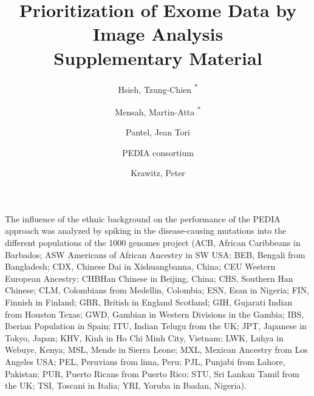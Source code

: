 \documentclass[11pt]{article}
\newcommand{\beginsupplement}{%
        \setcounter{table}{1}
        \setcounter{figure}{0}
        \renewcommand{\thefigure}{Supplementary \arabic{figure}}%
     }
\begin{document}
\title{\textbf{Prioritization of Exome Data by Image Analysis \\ Supplementary Material}}
\author[1, 2]{Hsieh, Tzung-Chien \textsuperscript{*}}
\author[2, 3]{Mensah, Martin-Atta \textsuperscript{*}}
\author[2, 3]{Pantel, Jean Tori}
\author[]{PEDIA consortium}
\author[1]{Krawitz, Peter}
\date{}
\maketitle
\clearpage

\beginsupplement
The influence of the ethnic background on the performance of the PEDIA approach was analyzed by spiking in the disease-causing mutations into the different populations of the 1000 genomes project (ACB, African Caribbeans in Barbados; ASW Americans of African Ancestry in SW USA; BEB, Bengali from Bangladesh; CDX, Chinese Dai in Xishuangbanna, China; CEU Western European Ancestry; CHBHan Chinese in Beijing, China; CHS, Southern Han Chinese; CLM, Colombians from Medellin, Colombia; ESN, Esan in Nigeria; FIN, Finnish in Finland; GBR, British in England Scotland; GIH, Gujarati Indian from Houston Texas; GWD, Gambian in Western Divisions in the Gambia; IBS, Iberian Population in Spain; ITU, Indian Telugu from the UK; JPT, Japanese in Tokyo, Japan; KHV, Kinh in Ho Chi Minh City, Vietnam; LWK, Luhya in Webuye, Kenya; MSL, Mende in Sierra Leone; MXL, Mexican Ancestry from Los Angeles USA; PEL, Peruvians from lima, Peru; PJL, Punjabi from Lahore, Pakistan; PUR, Puerto Ricans from Puerto Rico; STU, Sri Lankan Tamil from the UK; TSI, Toscani in Italia; YRI, Yoruba in Ibadan, Nigeria).
\end{document}
